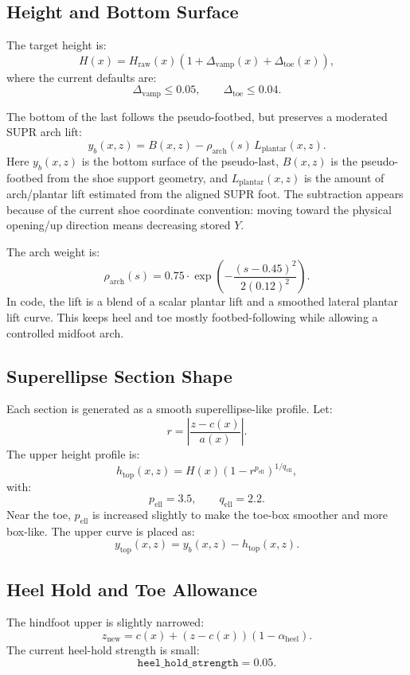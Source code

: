 \documentclass[11pt]{article}
\begin{document}
\subsection{Height and Bottom Surface}

The target height is:
\[
H(x)=H_{\text{raw}}(x)
\left(1+\Delta_{\text{vamp}}(x)+\Delta_{\text{toe}}(x)\right),
\]
where the current defaults are:
\[
\Delta_{\text{vamp}} \le 0.05,
\qquad
\Delta_{\text{toe}} \le 0.04.
\]

The bottom of the last follows the pseudo-footbed, but preserves a moderated
SUPR arch lift:
\[
y_b(x,z)
=
B(x,z)
-
\rho_{\text{arch}}(s)\,L_{\text{plantar}}(x,z).
\]
Here \(y_b(x,z)\) is the bottom surface of the pseudo-last, \(B(x,z)\) is the
pseudo-footbed from the shoe support geometry, and \(L_{\text{plantar}}(x,z)\)
is the amount of arch/plantar lift estimated from the aligned SUPR foot.  The
subtraction appears because of the current shoe coordinate convention: moving
toward the physical opening/up direction means decreasing stored \(Y\).

The arch weight is:
\[
\rho_{\text{arch}}(s)
=
0.75\cdot
\exp\left(
-\frac{(s-0.45)^2}{2(0.12)^2}
\right).
\]
In code, the lift is a blend of a scalar plantar lift and a smoothed lateral
plantar lift curve.  This keeps heel and toe mostly footbed-following while
allowing a controlled midfoot arch.

\subsection{Superellipse Section Shape}

Each section is generated as a smooth superellipse-like profile.  Let:
\[
r=\left|\frac{z-c(x)}{a(x)}\right|.
\]
The upper height profile is:
\[
h_{\text{top}}(x,z)
=
H(x)
\left(1-r^{p_{\mathrm{ell}}}\right)^{1/q_{\mathrm{ell}}},
\]
with:
\[
p_{\mathrm{ell}}=3.5,\qquad q_{\mathrm{ell}}=2.2.
\]
Near the toe, \(p_{\mathrm{ell}}\) is increased slightly to make the toe-box
smoother and more box-like.  The upper curve is placed as:
\[
y_{\text{top}}(x,z)=y_b(x,z)-h_{\text{top}}(x,z).
\]

\subsection{Heel Hold and Toe Allowance}

The hindfoot upper is slightly narrowed:
\[
z_{\text{new}}
=
c(x)+\left(z-c(x)\right)\left(1-\alpha_{\text{heel}}\right).
\]
The current heel-hold strength is small:
\[
\texttt{heel\_hold\_strength}=0.05.
\]
\end{document}
